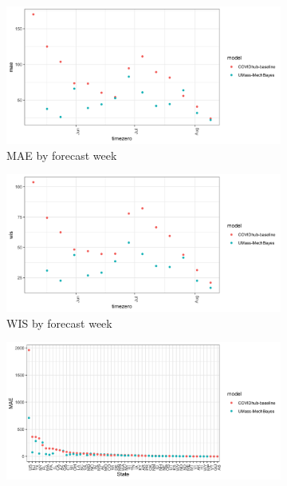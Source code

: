 \documentclass[11pt]{amsart}
\begin{document}
\begin{figure}
  \centering
     \begin{subfigure}{.5\textwidth}
  \centering
    \includegraphics[scale=.1]{mae_results_by_time_zero_inc.png}
    \caption{MAE by forecast week}
\end{subfigure}%
\begin{subfigure}{.5\textwidth}
  \centering
    \includegraphics[scale=.1]{wis_results_by_time_zero_inc.png}
    \caption{WIS by forecast week}
\end{subfigure}
\begin{subfigure}{.5\textwidth}
  \centering
    \includegraphics[scale=.1]{mae_results_by_region_inc.png}

\end{subfigure}
\end{figure}
\end{document}
